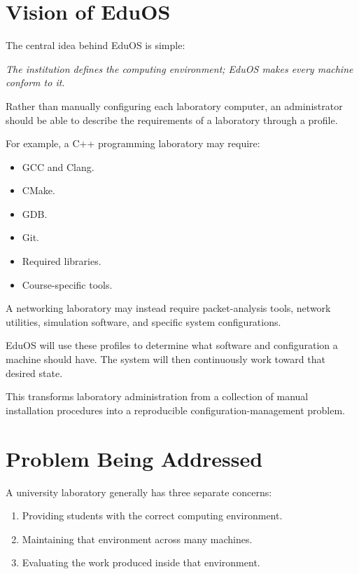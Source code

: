 \documentclass[12pt,a4paper]{article}
\begin{document}
\section{Vision of EduOS}

The central idea behind EduOS is simple:

\begin{center}
\textit{The institution defines the computing environment; EduOS makes every machine conform to it.}
\end{center}

Rather than manually configuring each laboratory computer, an administrator should be able to describe the requirements of a laboratory through a profile.

For example, a C++ programming laboratory may require:

\begin{itemize}
    \item GCC and Clang.
    \item CMake.
    \item GDB.
    \item Git.
    \item Required libraries.
    \item Course-specific tools.
\end{itemize}

A networking laboratory may instead require packet-analysis tools, network utilities, simulation software, and specific system configurations.

EduOS will use these profiles to determine what software and configuration a machine should have. The system will then continuously work toward that desired state.

This transforms laboratory administration from a collection of manual installation procedures into a reproducible configuration-management problem.

\section{Problem Being Addressed}

A university laboratory generally has three separate concerns:

\begin{enumerate}
    \item Providing students with the correct computing environment.
    \item Maintaining that environment across many machines.
    \item Evaluating the work produced inside that environment.
\end{enumerate}
\end{document}
